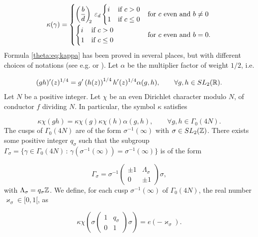 \documentclass[leqno,10pt]{amsart}
\theoremstyle{plain}
\numberwithin{equation}{section}
\theoremstyle{definition}
\theoremstyle{remark}
\begin{document}
\begin{equation}\label{theta:eq:kappa}
\kappa(\gamma)=\begin{cases}\displaystyle
\left(\frac{b}{d}\right)_{\!\!2} \, \varepsilon_d
\begin{cases} i & \textnormal{if }c>0 \\ 1& \textnormal{if } c \le 0 \end{cases}  
& \textnormal{for $c$ even and $b \neq 0$}\\
\begin{cases} i & \textnormal{if }c>0 \\ 1& \textnormal{if } c \le 0 \end{cases}  
& \textnormal{for $c$ even and $b = 0$}.\end{cases}
\end{equation}
Formula \eqref{theta:eq:kappa} has been proved in several places, but with different choices of notations (see e.g. \cite{kub} or \cite[(1.9)-(1.10)]{shi}).
Let $\alpha$ be the multiplier factor of weight $1/2$, i.e.

\begin{equation*}
(gh)'(z)^{1/4} = g'\left(h(z)\right)^{1/4} h'(z)^{1/4} \alpha(g,h), \qquad \forall g,h \in SL_2(\mathbb{R}).
\end{equation*}
Let $N$ be a positive integer. Let $\chi$ be an even Dirichlet character modulo $N$, of conductor $f$ dividing $N$. In particular, the symbol $\kappa$ satisfies

\begin{equation}\label{mod:eq:2}
\kappa\chi(gh) = \kappa\chi(g) \kappa\chi(h) \alpha(g,h), \qquad \forall g,h \in \Gamma_0(4N).
\end{equation}
The cusps of $\Gamma_0(4N)$ are of the form $\sigma^{-1}(\infty)$ with $\sigma\in SL_2(\mathbb{Z})$. There exists some positive integer $q_\sigma$ such that the subgroup $\Gamma_\sigma=\{\gamma\in \Gamma_0(4N)\,:\, \gamma(\sigma^{-1}(\infty))= \sigma^{-1}(\infty)\}$ is of the form

\begin{equation*}
\Gamma_\sigma= \sigma^{-1} \begin{pmatrix} \pm1& \Lambda_\sigma\\ 0&\pm1 \end{pmatrix} \sigma ,
\end{equation*}
with $\Lambda_\sigma =q_\sigma \mathbb{Z}$. We define, for each cusp $\sigma^{-1}(\infty)$ of $\Gamma_0(4N)$, the real number $\varkappa_\sigma\in[0,1[$, as 

\begin{equation*}
\kappa\chi \left( \sigma\begin{pmatrix}1&q_\sigma \\0&1\end{pmatrix}\sigma\right)=e(-\varkappa_\sigma).
\end{equation*}
\end{document}
